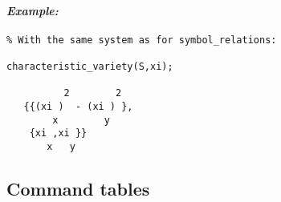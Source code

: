 \paragraph{\it Example:}
\begin{verbatim}
% With the same system as for symbol_relations:

characteristic_variety(S,xi);

          2        2
   {{(xi )  - (xi ) },
        x        y 
    {xi ,xi }}
       x   y
\end{verbatim}










\subsection{Command tables}\label{tables}


